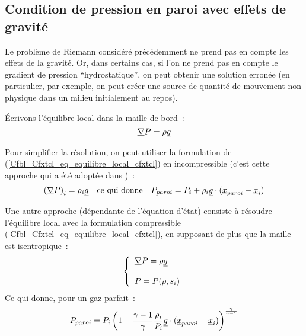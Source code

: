 \subsection*{Condition de pression en paroi avec effets de gravit\'e}

Le probl\`eme de Riemann consid\'er\'e pr\'ec\'edemment
ne prend pas en compte les effets de la gravit\'e.
Or, dans certains cas, si l'on ne prend pas en compte le gradient de
pression ``hydrostatique'',  on peut obtenir une solution erron\'ee
(en particulier, par exemple,
on peut cr\'eer une source de quantit\'e de mouvement
non physique dans un milieu initialement au repos).

\'Ecrivons l'\'equilibre local dans la maille de bord~:
\begin{equation}\label{Cfbl_Cfxtcl_eq_equilibre_local_cfxtcl}
\underline{\nabla}{P} = \rho \underline{g}
\end{equation}

Pour simplifier la r\'esolution, on peut utiliser la formulation
de (\ref{Cfbl_Cfxtcl_eq_equilibre_local_cfxtcl}) en incompressible
(c'est cette approche qui a \'et\'e adopt\'ee dans \CS)~:
\begin{equation}\label{Cfbl_Cfxtcl_eq_equilibre_incompressible_cfxtcl}
\begin{array}{lll}
\left(\underline{\nabla}{P}\right)_i = \rho_i \underline{g}
& \text{ce qui donne}
& P_{paroi} = P_i + \rho_i \underline{g} \cdot (\underline{x}_{paroi} - \underline{x}_i)
\end{array}
\end{equation}


Une autre approche (d\'ependante de l'\'equation d'\'etat)
consiste \`a r\'esoudre l'\'equilibre local avec la formulation
compressible (\ref{Cfbl_Cfxtcl_eq_equilibre_local_cfxtcl}), en supposant de plus que
la maille est isentropique~:
\begin{equation}
\left\{\begin{array}{lll}
\underline{\nabla}{P} = \rho \underline{g}\\
\\
P = P(\rho,s_i)
\end{array}\right.
\end{equation}
Ce qui donne, pour un gaz parfait~:
\begin{equation}
\label{Cfbl_Cfxtcl_eq_equilibre_compressible_cfxtcl}
 P_{paroi} = P_i \left( 1+ \displaystyle\frac{\gamma -1}{\gamma}
\displaystyle\frac{\rho_i}{P_i} \underline{g} \cdot (\underline{x}_{paroi} - \underline{x}_i)
\right)^{\frac{\gamma}{\gamma -1}}
\end{equation}

